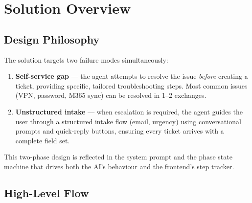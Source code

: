 \documentclass[12pt, a4paper]{article}
\begin{document}
\section{Solution Overview}

\subsection{Design Philosophy}

The solution targets two failure modes simultaneously:

\begin{enumerate}[leftmargin=*, label=\arabic*.]
  \item \textbf{Self-service gap} — the agent attempts to resolve the issue \emph{before}
        creating a ticket, providing specific, tailored troubleshooting steps. Most common
        issues (VPN, password, M365 sync) can be resolved in 1--2 exchanges.
  \item \textbf{Unstructured intake} — when escalation is required, the agent guides the
        user through a structured intake flow (email, urgency) using conversational prompts
        and quick-reply buttons, ensuring every ticket arrives with a complete field set.
\end{enumerate}

This two-phase design is reflected in the system prompt and the phase state machine that
drives both the AI's behaviour and the frontend's step tracker.

\subsection{High-Level Flow}
\end{document}
